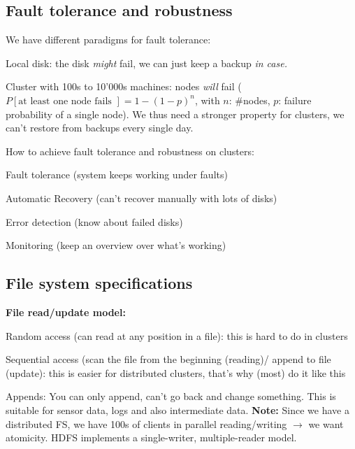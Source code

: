 \documentclass[11pt,oneside,a4paper]{article}
\begin{document}
\subsection{Fault tolerance and robustness}

We have different paradigms for fault tolerance:

\begin{compactitem}
	\item Local disk: the disk \textit{might} fail, we can just keep a backup \textit{in case.}
	\item Cluster with 100s to 10'000s machines: nodes \textit{will} fail ($P[\text{at least one node fails
	}] = 1-(1-p)^n$, with $n$: \#nodes, $p$: failure probability of a single node). We thus need a stronger property for clusters, we can't restore from backups every single day.
\end{compactitem}

How to achieve fault tolerance and robustness on clusters:

\begin{compactitem}
	\item Fault tolerance (system keeps working under faults)
	\item Automatic Recovery (can't recover manually with lots of disks)
	\item Error detection (know about failed disks)
	\item Monitoring (keep an overview over what's working)
\end{compactitem}

\subsection{File system specifications}

\textbf{File read/update model:}

\begin{compactitem}
	\item Random access (can read at any position in a file): this is hard to do in clusters
	\item Sequential access (scan the file from the beginning (reading)/ append to file (update): this is easier for distributed clusters, that's why (most) do it like this
\end{compactitem}

Appends: You can only append, can't go back and change something. This is suitable for sensor data, logs and also intermediate data. \textbf{Note:} Since we have a distributed FS, we have 100s of clients in parallel reading/writing $\rightarrow$ we want atomicity. HDFS implements a single-writer, multiple-reader model.
\end{document}
